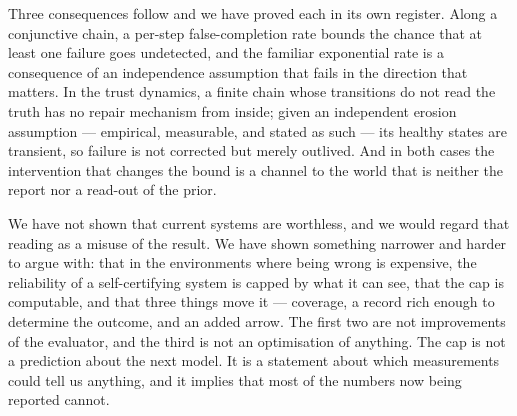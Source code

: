 \documentclass[11pt,a4paper]{article}
\begin{document}
Three consequences follow and we have proved each in its own register. Along a
conjunctive chain, a per-step false-completion rate bounds the chance that at
least one failure goes undetected, and the familiar exponential rate is a
consequence of an independence assumption that fails in the direction that
matters. In the trust dynamics, a finite chain whose transitions do not read the
truth has no repair mechanism from inside; given an independent erosion assumption
--- empirical, measurable, and stated as such --- its healthy states are transient, so
failure is not corrected but merely outlived. And in both cases the intervention
that changes the bound is a channel to the world that is neither the report nor a
read-out of the prior.

We have not shown that current systems are worthless, and we would regard that
reading as a misuse of the result. We have shown something narrower and harder to
argue with: that in the environments where being wrong is expensive, the
reliability of a self-certifying system is capped by what it can see, that the cap
is computable, and that three things move it --- coverage, a record rich enough to
determine the outcome, and an added arrow. The first two are not improvements of
the evaluator, and the third is not an optimisation of anything. The cap is not a
prediction about the next model. It is a statement about which measurements could
tell us anything, and it implies that most of the numbers now being reported cannot.



\end{document}
